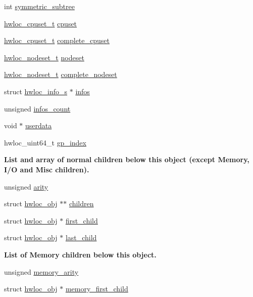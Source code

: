 \begin{DoxyCompactItemize}
\item 
int \hyperlink{a00238_a0f41a1d67dc6b661906f2217563637f3}{symmetric\+\_\+subtree}
\item 
\hyperlink{a00183_ga4bbf39b68b6f568fb92739e7c0ea7801}{hwloc\+\_\+cpuset\+\_\+t} \hyperlink{a00238_a67925e0f2c47f50408fbdb9bddd0790f}{cpuset}
\item 
\hyperlink{a00183_ga4bbf39b68b6f568fb92739e7c0ea7801}{hwloc\+\_\+cpuset\+\_\+t} \hyperlink{a00238_a91788a9da687beb7224cc1fd7b75208c}{complete\+\_\+cpuset}
\item 
\hyperlink{a00183_ga37e35730fa7e775b5bb0afe893d6d508}{hwloc\+\_\+nodeset\+\_\+t} \hyperlink{a00238_a08f0d0e16c619a6e653526cbee4ffea3}{nodeset}
\item 
\hyperlink{a00183_ga37e35730fa7e775b5bb0afe893d6d508}{hwloc\+\_\+nodeset\+\_\+t} \hyperlink{a00238_ac38c4012127525ef74c5615c526f4c2e}{complete\+\_\+nodeset}
\item 
struct \hyperlink{a00286}{hwloc\+\_\+info\+\_\+s} $\ast$ \hyperlink{a00238_a8604654c38b7a720efae5025d3a96ee6}{infos}
\item 
unsigned \hyperlink{a00238_a9843acc28cfbba903b63ea14b137ff70}{infos\+\_\+count}
\item 
void $\ast$ \hyperlink{a00238_a76fd3ac94401cf32dfccc3a3a8de68a5}{userdata}
\item 
hwloc\+\_\+uint64\+\_\+t \hyperlink{a00238_a957984a355fa61c85f46605c336e7551}{gp\+\_\+index}
\end{DoxyCompactItemize}
\begin{Indent}\textbf{ List and array of normal children below this object (except Memory, I/O and Misc children).}\par
\begin{DoxyCompactItemize}
\item 
unsigned \hyperlink{a00238_aac3f6da35c9b57599909a44ce2b716c1}{arity}
\item 
struct \hyperlink{a00238}{hwloc\+\_\+obj} $\ast$$\ast$ \hyperlink{a00238_a04d05403da37bfe17cd63b7c7dd07b1f}{children}
\item 
struct \hyperlink{a00238}{hwloc\+\_\+obj} $\ast$ \hyperlink{a00238_af51d08a0a79dba517c06c5afedc8d2dc}{first\+\_\+child}
\item 
struct \hyperlink{a00238}{hwloc\+\_\+obj} $\ast$ \hyperlink{a00238_a84bd65634dbc55f4158b74443a9bd04f}{last\+\_\+child}
\end{DoxyCompactItemize}
\end{Indent}
\begin{Indent}\textbf{ List of Memory children below this object.}\par
\begin{DoxyCompactItemize}
\item 
unsigned \hyperlink{a00238_a6f834ea4dd26553cdea601d2fae6d3b7}{memory\+\_\+arity}
\item 
struct \hyperlink{a00238}{hwloc\+\_\+obj} $\ast$ \hyperlink{a00238_ac0e8200dba25b90d5954bd4ec61f97d3}{memory\+\_\+first\+\_\+child}
\end{DoxyCompactItemize}
\end{Indent}
